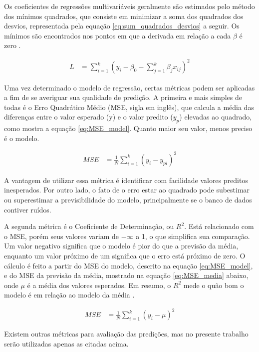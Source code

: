 \documentclass[brazil,tf,epusp]{usp}  %
\begin{document}
Os coeficientes de regressões multivariáveis geralmente são estimados pelo método dos mínimos quadrados, que consiste em minimizar a soma dos quadrados dos desvios, representada pela equação \ref{eq:sum_quadrados_desvios} a seguir. Os mínimos são encontrados nos pontos em que a derivada em relação a cada $\beta$ é zero \cite{Montgomery2013}.

\begin{align}
  L &=  \sum_{i=1}^k(y_i - \beta_0 - \sum_{j=1}^k  \beta_j x_{ij})^2
  \label{eq:sum_quadrados_desvios}
\end{align}

Uma vez determinado o modelo de regressão, certas métricas podem ser aplicadas a fim de se averiguar sua qualidade de predição. A primeira e mais simples de todas é o Erro Quadrático Médio (MSE, sigla em inglês), que calcula a média das diferenças entre o valor esperado (y) e o valor predito ($y_p$) elevadas ao quadrado, como mostra a equação \ref{eq:MSE_model}. Quanto maior seu valor, menos preciso é o modelo.

\begin{align}
  MSE &= \frac{1}{N} \sum_{i=1}^k(y_i - y_{pi})^2
  \label{eq:MSE_model}
\end{align}

A vantagem de utilizar essa métrica é identificar com facilidade valores preditos inesperados. Por outro lado, o fato de o erro estar ao quadrado pode subestimar ou superestimar a previsibilidade do modelo, principalmente se o banco de dados contiver ruídos.

A segunda métrica é o Coeficiente de Determinação, ou $R^{2}$. Está relacionado com o MSE, porém seus valores variam de $-\infty$ a 1, o que simplifica sua comparação. Um valor negativo significa que o modelo é pior do que a previsão da média, enquanto um valor próximo de um significa que o erro está próximo de zero. O cálculo é feito a partir do MSE do modelo, descrito na equação \ref{eq:MSE_model}, e do MSE da previsão da média, mostrado na equação \ref{eq:MSE_media} abaixo, onde $\mu$ é a média dos valores esperados. Em resumo, o $R^{2}$ mede o quão bom o modelo é em relação ao modelo da média \cite{Drakos2018}.

\begin{align}
  MSE &= \frac{1}{N} \sum_{i=1}^k(y_i - \mu)^2
  \label{eq:MSE_media}
\end{align}


Existem outras métricas para avaliação das predições, mas no presente trabalho serão utilizadas apenas as citadas acima.
\end{document}
